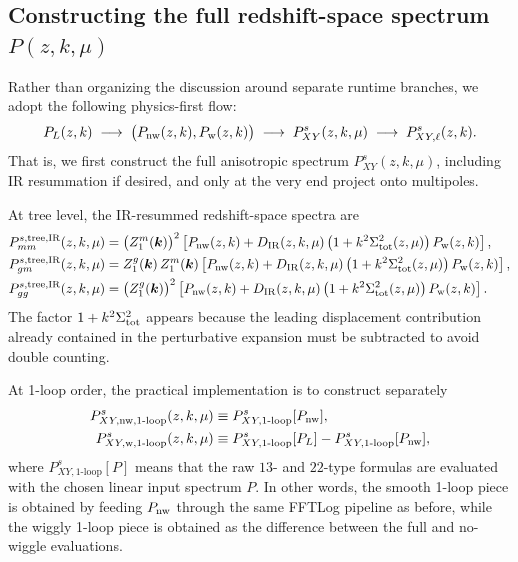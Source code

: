 \documentclass[a4paper,11pt]{article}
\newcommand{\vk}{\bm{k}}
\newcommand{\<}{\langle}
\renewcommand{\>}{\rangle}
\begin{document}
\subsection{Constructing the full redshift-space spectrum \(P(z,k,\mu)\)}

Rather than organizing the discussion around separate runtime branches, we adopt the following physics-first flow:
\begin{equation}
P_L(z,k)
\;\longrightarrow\;
\bigl(P_{\rm nw}(z,k),P_{\rm w}(z,k)\bigr)
\;\longrightarrow\;
P_{XY}^s(z,k,\mu)
\;\longrightarrow\;
P_{XY,\ell}^s(z,k).
\end{equation}
That is, we first construct the full anisotropic spectrum \(P_{XY}^s(z,k,\mu)\), including IR resummation if desired, and only at the very end project onto multipoles.

At tree level, the IR-resummed redshift-space spectra are
\begin{align}
P_{mm}^{s,\mathrm{tree,IR}}(z,k,\mu)
&=
\bigl(Z_1^m(\vk)\bigr)^2
\left[
P_{\rm nw}(z,k)
+
D_{\rm IR}(z,k,\mu)\,
\bigl(1+k^2\Sigma_{\rm tot}^2(z,\mu)\bigr)\,
P_{\rm w}(z,k)
\right],
\label{eq:Pmm_tree_IR_note}
\\
P_{gm}^{s,\mathrm{tree,IR}}(z,k,\mu)
&=
Z_1^g(\vk)\,Z_1^m(\vk)
\left[
P_{\rm nw}(z,k)
+
D_{\rm IR}(z,k,\mu)\,
\bigl(1+k^2\Sigma_{\rm tot}^2(z,\mu)\bigr)\,
P_{\rm w}(z,k)
\right],
\label{eq:Pgm_tree_IR_note}
\\
P_{gg}^{s,\mathrm{tree,IR}}(z,k,\mu)
&=
\bigl(Z_1^g(\vk)\bigr)^2
\left[
P_{\rm nw}(z,k)
+
D_{\rm IR}(z,k,\mu)\,
\bigl(1+k^2\Sigma_{\rm tot}^2(z,\mu)\bigr)\,
P_{\rm w}(z,k)
\right].
\label{eq:Pgg_tree_IR_note}
\end{align}
The factor \(1+k^2\Sigma_{\rm tot}^2\) appears because the leading displacement contribution already contained in the perturbative expansion must be subtracted to avoid double counting.

At 1-loop order, the practical implementation is to construct separately
\begin{align}
P_{XY,\mathrm{nw},1\text{-loop}}^s(z,k,\mu)
&\equiv
P_{XY,1\text{-loop}}^s[P_{\rm nw}],
\label{eq:PXY_1loop_nw_note}
\\
P_{XY,\mathrm{w},1\text{-loop}}^s(z,k,\mu)
&\equiv
P_{XY,1\text{-loop}}^s[P_L]
-
P_{XY,1\text{-loop}}^s[P_{\rm nw}],
\label{eq:PXY_1loop_w_note}
\end{align}
where \(P_{XY,1\text{-loop}}^s[P]\) means that the raw \(13\)- and \(22\)-type formulas are evaluated with the chosen linear input spectrum \(P\). In other words, the smooth 1-loop piece is obtained by feeding \(P_{\rm nw}\) through the same FFTLog pipeline as before, while the wiggly 1-loop piece is obtained as the difference between the full and no-wiggle evaluations.
\end{document}
